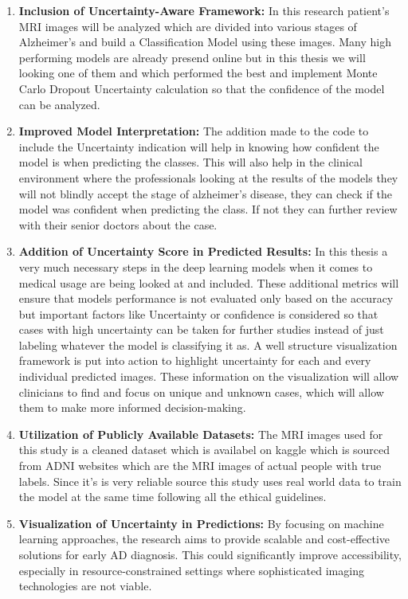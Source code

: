 \documentclass[12pt,onecolumn]{report}
\begin{document}
\begin{enumerate}
    \item \textbf{ Inclusion of Uncertainty-Aware Framework:} In this research patient's MRI images will be analyzed which are divided into various stages of Alzheimer's and build a Classification Model using these images. Many high performing models are already presend online but in this thesis we will looking one of them and which performed the best and implement Monte Carlo Dropout Uncertainty calculation so that the confidence of the model can be analyzed.

    \item  \textbf{ Improved Model Interpretation:} The addition made to the code to include the Uncertainty indication will help in knowing how confident the model is when predicting the classes. This will also help in the clinical environment where the professionals looking at the results of the models they will not blindly accept the stage of alzheimer's disease, they can check if the model was confident when predicting the class. If not they can further review with their senior doctors about the case.

    \item \textbf{ Addition of Uncertainty Score in Predicted Results:}
    In this thesis a very much necessary steps in the deep learning models when it comes to medical usage are being looked at and included. These additional metrics will ensure that models performance is not evaluated only based on the accuracy but important factors like Uncertainty or confidence is considered so that cases with high uncertainty can be taken for further studies instead of just labeling whatever the model is classifying it as. A well structure visualization framework is put into action to highlight uncertainty for each and every individual predicted images. These information on the visualization will allow clinicians to find and focus on unique and unknown cases, which will allow them to make more informed decision-making.
    

    \item \textbf{Utilization of Publicly Available Datasets:} The MRI images used for this study is a cleaned dataset which is availabel on kaggle which is sourced from ADNI websites which are the MRI images of actual people with true labels. Since it's is very reliable source this study uses real world data to train the model at the same time following all the ethical guidelines.
    
    \item \textbf{Visualization of Uncertainty in Predictions:} By focusing on machine learning approaches, the research aims to provide scalable and cost-effective solutions for early AD diagnosis. This could significantly improve accessibility, especially in resource-constrained settings where sophisticated imaging technologies are not viable.


\end{enumerate}
\end{document}

